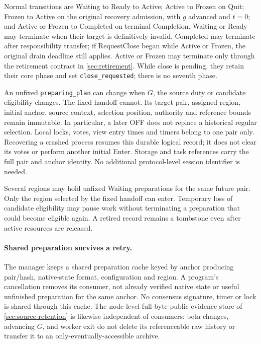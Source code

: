 \documentclass[11pt,a4paper]{article}
\newcounter{protocol}
\begin{document}
Normal transitions are Waiting to Ready to Active; Active to Frozen
on Quit; Frozen to Active on the original recovery admission, with
$g$ advanced and $t=0$; and Active or Frozen to Completed on terminal
Completion. Waiting or Ready may terminate when their target is
definitively invalid. Completed may terminate after responsibility
transfer; if RequestClose began while Active or Frozen, the original
drain deadline still applies. Active or Frozen may terminate only through the retirement
contract in \cref{sec:retirement}. While close is pending, they retain
their core phase and set \texttt{close\_requested}; there is no seventh
phase.

An unfixed \texttt{preparing\_plan} can change when $G$, the source
duty or candidate eligibility changes. The fixed handoff cannot.
Its target pair, assigned region, initial anchor, source context,
selection position, authority and reference bounds remain immutable.
In particular, a later OFF does not replace a historical regular
selection. Local locks, votes, view entry times and timers belong to
one pair only. Recovering a crashed process resumes this durable
logical record; it does not clear its votes or perform another initial
Enter. Storage and task references carry the full pair and anchor
identity. No additional protocol-level session identifier is needed.

Several regions may hold unfixed Waiting preparations for the same
future pair. Only the region selected by the fixed handoff can enter.
Temporary loss of candidate eligibility may pause work without
terminating a preparation that could become eligible again. A retired
record remains a tombstone even after active resources are released.

\paragraph{Shared preparation survives a retry.}
The manager keeps a shared preparation cache keyed by anchor producing
pair/hash, native-state format, configuration and region. A program's
cancellation removes its consumer, not already verified native state
or useful unfinished preparation for the same anchor. No consensus
signature, timer or lock is shared through this cache. The node-level
full-byte public evidence store of \cref{sec:source-retention} is likewise
independent of consumers: beta changes, advancing $G$, and worker exit
do not delete its referenceable raw history or transfer it to an
only-eventually-accessible archive.
\end{document}
